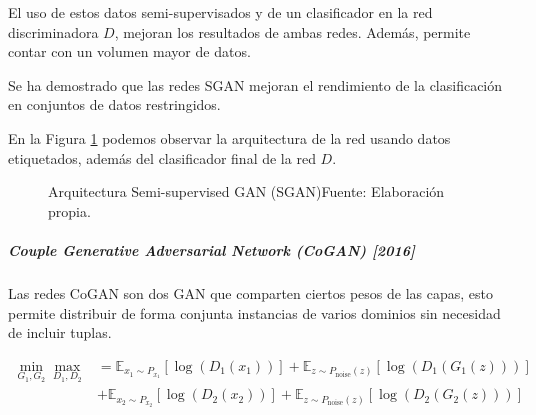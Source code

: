 El uso de estos datos semi-supervisados y de un clasificador en la red discriminadora ${D}$, mejoran los resultados de ambas redes. Además, permite contar con un volumen mayor de datos.

Se ha demostrado que las redes \gls{SGAN} mejoran el rendimiento de la clasificación en conjuntos de datos restringidos.

En la Figura \ref{fig:SGAN} podemos observar la arquitectura de la red usando datos etiquetados, además del clasificador final de la red ${D}$.

\begin{figure}[H]
    \centering
    \centerline{}
    \caption{Arquitectura Semi-supervised GAN ({SGAN})\newline{}Fuente: Elaboración propia.}
    \label{fig:SGAN}
\end{figure}



\subparagraph{Couple Generative Adversarial Network (CoGAN) [2016]}

Las redes \gls{CoGAN} \cite{CoGAN-liu2016coupled} son dos \gls{GAN} que comparten ciertos pesos de las capas, esto permite distribuir de forma conjunta instancias de varios dominios sin necesidad de incluir tuplas.


\begin{equation}
    \begin{split}
        \min_{G_{1},G_{2}}\max_{D_{1},D_{2}}
        & = \mathbb{E}_{x_{1}\sim{}P_{x_{1}}}  \left[ \log{\left( D_{1}(x_{1}) \right)} \right] + \mathbb{E}_{z\sim{}P_{\text{noise}}(z)}      \left[ \log{\left( D_{1}(G_{1}(z))  \right)} \right]   \\
        & + \mathbb{E}_{x_{2}\sim{}P_{x_{2}}}  \left[ \log{\left( D_{2}(x_{2}) \right)} \right] + \mathbb{E}_{z\sim{}P_{\text{noise}}(z)}      \left[ \log{\left( D_{2}(G_{2}(z))  \right)} \right]
    \end{split}
\end{equation}

